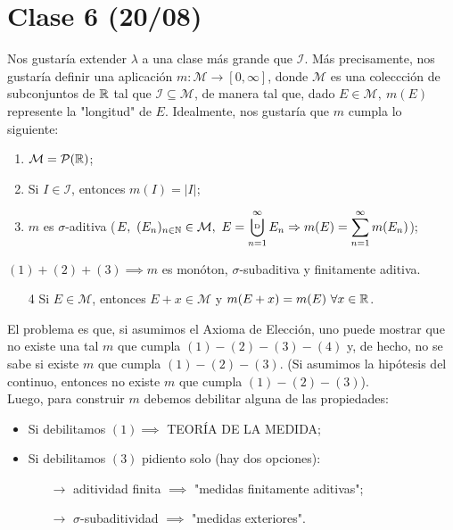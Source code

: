 \documentclass[a4paper]{report}
\newcommand{\bigcupd}{\mathop{\ensurestackMath{\stackinset{l}{}{c}{+.25ex}{\hspace{3pt}{\text{\tiny{D}}}}{\displaystyle{\bigcup}}}}}
\begin{document}
	\section{Clase 6 (20/08)}

	Nos gustaría extender $\lambda$ a una clase más grande que $\mathcal{I}$. Más precisamente, nos gustaría definir una aplicación $m : \mathcal{M} \to [0,\infty]$, donde $\mathcal{M}$ es una coleccción de subconjuntos de $\mathbb{R}$ tal que $\mathcal{I} \subseteq \mathcal{M}$, de manera tal que, dado $E \in \mathcal{M},\ m(E)$ represente la "longitud" de $E$. Idealmente, nos gustaría que $m$ cumpla lo siguiente:

	\begin{enumerate}
		\item $\mathcal{M} = \mathcal{P}(\mathbb{R})$;

		\item Si $I \in \mathcal{I}$, entonces $m(I) = |I|$;

		\item $m$ es $\sigma$-aditiva ($E,\ (E_n)_{n\in\N}\in \mathcal{M},\ E = \displaystyle\bigcupd_{n=1}^{\infty} E_n \implies m(E) = \sum_{n=1}^{\infty} m(E_n)$);
	\end{enumerate}

	\begin{ex}
		$(1)+(2)+(3) \implies m$ es monóton, $\sigma$-subaditiva y finitamente aditiva. 
	\end{ex}

	\begin{enumerate}
		\item[4] Si $E \in \mathcal{M}$, entonces $E + x \in \mathcal{M}$ y $m(E + x) = m(E)\ \forall x \in \mathbb{R}$.
	\end{enumerate}

	\noindent El problema es que, si asumimos el Axioma de Elección, uno puede mostrar que no existe una tal $m$ que cumpla $(1)-(2)-(3)-(4)$ y, de hecho, no se sabe si existe $m$ que cumpla $(1)-(2)-(3)$. (Si asumimos la hipótesis del continuo, entonces no existe $m$ que cumpla $(1)-(2)-(3)$). \\

	\noindent Luego, para construir $m$ debemos debilitar alguna de las propiedades:
	\begin{itemize}
		\item Si debilitamos $(1) \implies$ TEORÍA DE LA MEDIDA;
		
		\item Si debilitamos $(3)$ pidiento solo (hay dos opciones):

		\begin{itemize}
			\item[$\rightarrow$] aditividad finita $ \implies$ "medidas finitamente aditivas";
		
			\item[$\rightarrow$] $\sigma$-subaditividad $\implies$ "medidas exteriores".
		\end{itemize}
	\end{itemize}
\end{document}

